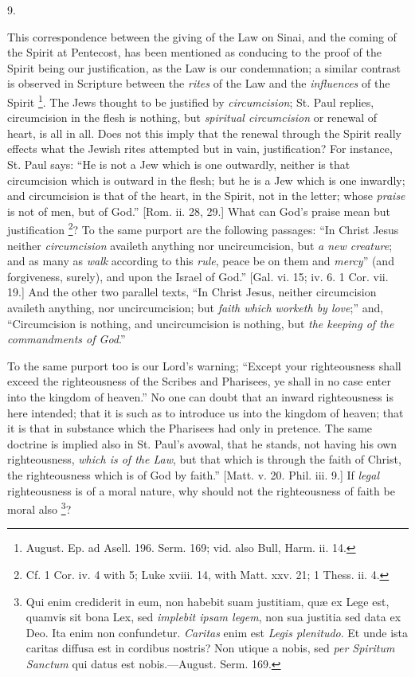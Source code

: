 9.

This correspondence between the giving of the Law on Sinai, and the
coming of the Spirit at Pentecost, has been mentioned as conducing to
the proof of the Spirit being our justification, as the Law is our
condemnation; a similar contrast is observed in Scripture between the \emph{rites}
of the Law and the \emph{influences} of the Spirit \footnote{August. Ep.
ad Asell. 196. Serm. 169; vid. also Bull, Harm. ii. 14.}. The Jews thought to be justified by \emph{circumcision}; St.
Paul replies, circumcision in the flesh is nothing, but \emph{spiritual
circumcision} or renewal of heart, is all in all. Does not this imply that the renewal through the Spirit really effects what the
Jewish rites attempted but in vain, justification? For instance, St.
Paul says: ``He is not a Jew which is one outwardly, neither is
that circumcision which is outward in the flesh; but he is a Jew which
is one inwardly; and circumcision is that of the heart, in the Spirit,
not in the letter; whose \emph{praise} is not of men, but of
God.'' [Rom. ii. 28, 29.] What can God's praise mean but
justification \footnote{Cf. 1 Cor.
iv. 4 with 5; Luke xviii. 14, with Matt. xxv. 21; 1 Thess. ii. 4.}? To the
same purport are the following passages: ``In Christ Jesus neither
\emph{circumcision} availeth anything nor uncircumcision, but \emph{a new
creature}; and as many as \emph{walk} according to this \emph{rule},
peace be on them and \emph{mercy}'' (and forgiveness, surely), and
upon the Israel of God.'' [Gal. vi. 15; iv. 6. 1 Cor. vii. 19.]
And the other two parallel texts, ``In Christ Jesus, neither
circumcision availeth anything, nor uncircumcision; but \emph{faith which
worketh by love};'' and, ``Circumcision is nothing, and
uncircumcision is nothing, but \emph{the keeping of the commandments of
God}.''

To the same purport too is our Lord's warning; ``Except your
righteousness shall exceed the righteousness of the Scribes and
Pharisees, ye shall in no case enter into the kingdom of heaven.''
No one can doubt that an inward righteousness is here intended; that
it is such as to introduce us into the kingdom of heaven; that it is
that in substance which the Pharisees had only in pretence. The same
doctrine is implied also in St. Paul's avowal, that he stands, not
having his own righteousness, \emph{which is of the Law}, but
that which is through the faith of Christ, the righteousness which is
of God by faith.'' [Matt. v. 20. Phil. iii. 9.] If \emph{legal}
righteousness is of a moral nature, why should not the righteousness
of faith be moral also \footnote{Qui enim
crediderit in eum, non habebit suam justitiam, quæ ex Lege est,
quamvis sit bona Lex, sed \emph{implebit ipsam legem}, non sua
justitia sed data ex Deo. Ita enim non confundetur. \emph{Caritas}
enim est \emph{Legis plenitudo}. Et unde ista caritas diffusa est in
cordibus nostris? Non utique a nobis, sed \emph{per Spiritum Sanctum}
qui datus est nobis.—August. Serm. 169.}?

